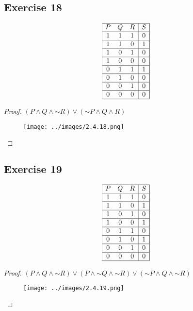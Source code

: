 \documentclass[14pt]{extarticle}
\begin{document}
\subsection{Exercise 18}
$$
    \begin{array}{|ccc|c|}
        \hline
        P & Q & R & S \\
        \hline
        1 & 1 & 1 & 0 \\
        \hline
        1 & 1 & 0 & 1 \\
        \hline
        1 & 0 & 1 & 0 \\
        \hline
        1 & 0 & 0 & 0 \\
        \hline
        0 & 1 & 1 & 1 \\
        \hline
        0 & 1 & 0 & 0 \\
        \hline
        0 & 0 & 1 & 0 \\
        \hline
        0 & 0 & 0 & 0 \\
        \hline
    \end{array}
$$

\begin{proof}
    $(P \wedge Q \wedge {\sim R}) \vee ({\sim P} \wedge Q \wedge R)$
    \begin{figure}[ht!]
        \centering
        \texttt{[image: ../images/2.4.18.png]}
    \end{figure}
\end{proof}

\subsection{Exercise 19}
$$
    \begin{array}{|ccc|c|}
        \hline
        P & Q & R & S \\
        \hline
        1 & 1 & 1 & 0 \\
        \hline
        1 & 1 & 0 & 1 \\
        \hline
        1 & 0 & 1 & 0 \\
        \hline
        1 & 0 & 0 & 1 \\
        \hline
        0 & 1 & 1 & 0 \\
        \hline
        0 & 1 & 0 & 1 \\
        \hline
        0 & 0 & 1 & 0 \\
        \hline
        0 & 0 & 0 & 0 \\
        \hline
    \end{array}
$$

\begin{proof}
    $(P \wedge Q \wedge {\sim R}) \vee (P \wedge {\sim Q} \wedge {\sim R}) \vee ({\sim P} \wedge Q \wedge {\sim R})$
    \begin{figure}[ht!]
        \centering
        \texttt{[image: ../images/2.4.19.png]}
    \end{figure}
\end{proof}
\end{document}
